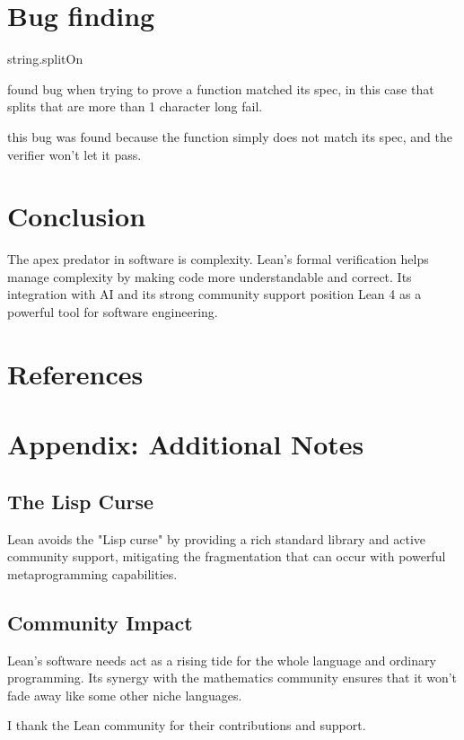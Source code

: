 \documentclass{article}
\begin{document}
\section{Bug finding}

string.splitOn

found bug when trying to prove a function matched its spec, in this case that splits that are more than 1 character long fail.

this bug was found because the function simply does not match its spec, and the verifier won't let it pass.

\section{Conclusion}

The apex predator in software is complexity. Lean's formal verification helps manage complexity by making code more understandable and correct. Its integration with AI and its strong community support position Lean 4 as a powerful tool for software engineering.

\section*{References}

\appendix

\section{Appendix: Additional Notes}

\subsection{The Lisp Curse}

Lean avoids the "Lisp curse" by providing a rich standard library and active community support, mitigating the fragmentation that can occur with powerful metaprogramming capabilities.

\subsection{Community Impact}

Lean's software needs act as a rising tide for the whole language and ordinary programming. Its synergy with the mathematics community ensures that it won't fade away like some other niche languages.

\begin{ack}
  I thank the Lean community for their contributions and support.
\end{ack}

\medskip

% 
% 
\end{document}
